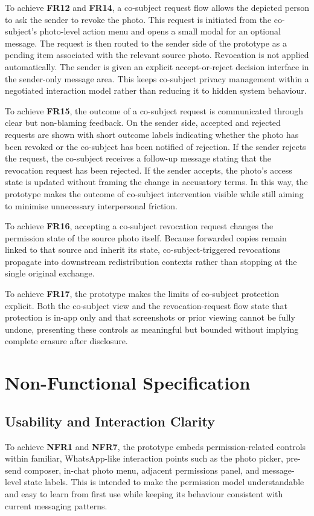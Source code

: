 To achieve \textbf{FR12} and \textbf{FR14},  a co-subject request flow allows the depicted person to ask the sender to revoke the photo. This request is initiated from the co-subject's photo-level action menu and opens a small modal for an optional message. The request is then routed to the sender side of the prototype as a pending item associated with the relevant source photo. Revocation is not applied automatically. The sender is given an explicit accept-or-reject decision interface in the sender-only message area. This keeps co-subject privacy management within a negotiated interaction model rather than reducing it to hidden system behaviour. 

To achieve \textbf{FR15}, the outcome of a co-subject request is communicated through clear but non-blaming feedback. On the sender side, accepted and rejected requests are shown with short outcome labels indicating whether the photo has been revoked or the co-subject has been notified of rejection. If the sender rejects the request, the co-subject receives a follow-up message stating that the revocation request has been rejected. If the sender accepts, the photo's access state is updated without framing the change in accusatory terms. In this way, the prototype makes the outcome of co-subject intervention visible while still aiming to minimise unnecessary interpersonal friction.

To achieve \textbf{FR16}, accepting a co-subject revocation request changes the permission state of the source photo itself. Because forwarded copies remain linked to that source and inherit its state, co-subject-triggered revocations propagate into downstream redistribution contexts rather than stopping at the single original exchange.

To achieve \textbf{FR17}, the prototype makes the limits of co-subject protection explicit. Both the co-subject view and the revocation-request flow state that protection is in-app only and that screenshots or prior viewing cannot be fully undone, presenting these controls as meaningful but bounded without implying complete erasure after disclosure.

\section{Non-Functional Specification}

\subsection{Usability and Interaction Clarity}
To achieve \textbf{NFR1} and \textbf{NFR7}, the prototype embeds permission-related controls within familiar, WhatsApp-like interaction points such as the photo picker, pre-send composer, in-chat photo menu, adjacent permissions panel, and message-level state labels. This is intended to make the permission model understandable and easy to learn from first use while keeping its behaviour consistent with current messaging patterns.

